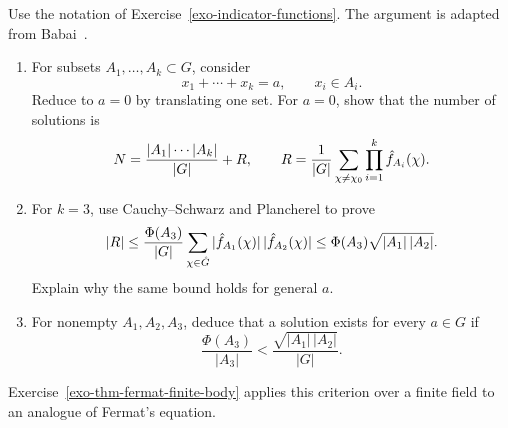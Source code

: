 \begin{exo}
\label{exo-eqn-grpe-abelien-finite}
Use the notation of Exercise~\ref{exo-indicator-functions}. The argument is
adapted from Babai~\cite{babai-fourier-equations}.
\begin{enumerate}
\item For subsets $A_1,\ldots,A_k\subset G$, consider
\begin{equation}
\label{eq-exo-nbr-solution-eqn-grpe-finite}
 x_1+\cdots+x_k=a,\qquad x_i\in A_i.
\end{equation}
Reduce to $a=0$ by translating one set. For $a=0$, show that the number of
solutions is
\[
 N=\frac{|A_1|\cdots|A_k|}{|G|}+R,\qquad
 R=\frac1{|G|}\sum_{\chi\neq\chi_0}\prod_{i=1}^k\hat{f}_{A_i}(\chi).
\]
\item For $k=3$, use Cauchy--Schwarz and Plancherel to prove
\[
 |R|\leq\frac{\Phi(A_3)}{|G|}
 \sum_{\chi\in\hat{G}}|\hat{f}_{A_1}(\chi)|\,|\hat{f}_{A_2}(\chi)|
 \leq\Phi(A_3)\sqrt{|A_1|\,|A_2|}.
\]
Explain why the same bound holds for general $a$.
\item For nonempty $A_1,A_2,A_3$, deduce that a solution exists for every
$a\in G$ if
\[
 \frac{\Phi(A_3)}{|A_3|}<\frac{\sqrt{|A_1|\,|A_2|}}{|G|}.
\]
\end{enumerate}
Exercise~\ref{exo-thm-fermat-finite-body} applies this criterion over a finite
field to an analogue of Fermat's equation.
\end{exo}


